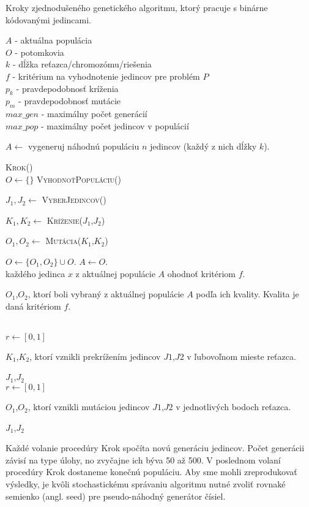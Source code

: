 \begin{algorithm}
\caption{Kroky zjednodušeného genetického algoritmu, ktorý pracuje s binárne kódovanými jedincami.}\label{fig:geneticAlgoritm}
$A$ - aktuálna populácia \\
$O$ - potomkovia \\
$k$ - dĺžka reťazca/chromozómu/riešenia \\
$f$ - kritérium na vyhodnotenie jedincov pre problém $P$\\
$p_{k}$ - pravdepodobnosť kríženia \\
$p_{m}$ - pravdepodobnosť mutácie \\
$max\_gen$ - maximálny počet generácií \\
$max\_pop$ - maximálny počet jedincov v populácií \\
\begin{algorithmic}

\State \parbox[t]{400pt}{$A \gets $ vygeneruj náhodnú populáciu $n$ jedincov (každý z nich dĺžky $k$).}

	\State \textsc{Krok()}
\EndFor
\\
	\State $O \gets \{\}$
	\State \textsc{VyhodnoťPopuláciu()}
		\State \parbox[t]{350pt}{$J_1,J_2 \gets $ \textsc{VyberJedincov()}}
		\State \parbox[t]{350pt}{$K_1,K_2 \gets $ \textsc{Kríženie($J_1$,$J_2$)}}
		\State \parbox[t]{350pt}{$O_1,O_2 \gets $ \textsc{Mutácia($K_1$,$K_2$)}}
		\State $O \gets \{O_1,O_2\} \cup O$.
	\EndWhile
	\State $A \gets O$.
\EndProcedure
\\
\State každého jedinca $x$ z aktuálnej populácie $A$ ohodnoť kritériom $f$.
\EndProcedure
\\
\State \Return \parbox[t]{300pt}{$O_1$,$O_2$, ktorí boli vybraný z aktuálnej populácie $A$ podľa ich kvality. Kvalita je daná kritériom $f$.}
\EndFunction
\\
\State $r \gets [0,1]$
	\State \Return \parbox[t]{300pt}{$K_1$,$K_2$, ktorí vznikli prekrížením jedincov $J1$,$J2$ v ľubovoľnom mieste reťazca.}
	\Else 
	\State \Return $J_1$,$J_2$
\EndIf 
\EndFunction
\\
\State $r \gets [0,1]$
	\State \Return \parbox[t]{300pt}{$O_1$,$O_2$, ktorí vznikli mutáciou jedincov $J1$,$J2$ v jednotlivých bodoch reťazca.}
	\Else 
	\State \Return $J_1$,$J_2$
\EndIf 
\EndFunction
\end{algorithmic}
\end{algorithm}
Každé volanie procedúry Krok spočíta novú generáciu jedincov. Počet generácii závisí na type úlohy, no zvyčajne ich býva 50 až 500. V poslednom volaní procedúry Krok dostaneme konečnú populáciu. Aby sme mohli zreprodukovať výsledky, je kvôli stochastickému správaniu algoritmu nutné zvoliť rovnaké semienko (angl. seed) pre pseudo-náhodný generátor čísiel.


